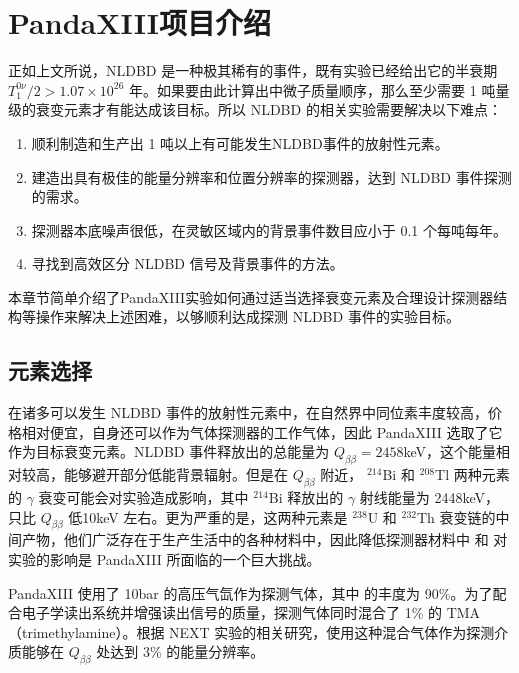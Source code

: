 \chapter{PandaXIII项目介绍}
\label{chapter:intro}

正如上文所说，NLDBD 是一种极其稀有的事件，既有实验已经给出它的半衰期 $T^{0\nu}_1/2>1.07\times10^{26}$ 年。如果要由此计算出中微子质量顺序，那么至少需要 1 吨量级的衰变元素才有能达成该目标。所以 NLDBD 的相关实验需要解决以下难点：

\vspace{0.4cm}
\begin{enumerate}
    \item 顺利制造和生产出 1 吨以上有可能发生NLDBD事件的放射性元素。
    \item 建造出具有极佳的能量分辨率和位置分辨率的探测器，达到 NLDBD 事件探测的需求。
    \item 探测器本底噪声很低，在灵敏区域内的背景事件数目应小于 0.1 个每吨每年。
    \item 寻找到高效区分 NLDBD 信号及背景事件的方法。
\end{enumerate}
\vspace{0.4cm}

本章节简单介绍了PandaXIII实验如何通过适当选择衰变元素及合理设计探测器结构等操作来解决上述困难，以够顺利达成探测 NLDBD 事件的实验目标。

\section{元素选择}

在诸多可以发生 NLDBD 事件的放射性元素中，\xeots 在自然界中同位素丰度较高，价格相对便宜，自身还可以作为气体探测器的工作气体，因此 PandaXIII 选取了它作为目标衰变元素。\xeots NLDBD 事件释放出的总能量为 $Q_{\beta\beta}=2458$keV，这个能量相对较高，能够避开部分低能背景辐射。但是在 $Q_{\beta\beta}$ 附近， $^{214}$Bi 和 $^{208}$Tl 两种元素的 $\gamma$ 衰变可能会对实验造成影响，其中 $^{214}$Bi 释放出的 $\gamma$ 射线能量为 2448keV，只比 $Q_{\beta\beta}$ 低10keV 左右。更为严重的是，这两种元素是 $^{238}$U 和 $^{232}$Th 衰变链的中间产物，他们广泛存在于生产生活中的各种材料中，因此降低探测器材料中 \utte 和 \thttt 对实验的影响是 PandaXIII 所面临的一个巨大挑战。

PandaXIII 使用了 10bar 的高压气氙作为探测气体，其中 \xeots 的丰度为 90\%。为了配合电子学读出系统并增强读出信号的质量，探测气体同时混合了 1\% 的 TMA（trimethylamine）。根据 NEXT 实验的相关研究，使用这种混合气体作为探测介质能够在 $Q_{\beta\beta}$ 处达到 3\% 的能量分辨率\supercite{azevedoh2015accurate}。

